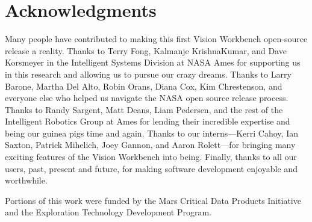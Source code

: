 \chapter*{Acknowledgments}

Many people have contributed to making this first Vision Workbench
open-source release a reality.  Thanks to Terry Fong, Kalmanje
KrishnaKumar, and Dave Korsmeyer in the Intelligent Systems Division
at NASA Ames for supporting us in this research and allowing us to
pursue our crazy dreams.  Thanks to Larry Barone, Martha Del Alto,
Robin Orans, Diana Cox, Kim Chrestenson, and everyone else who helped us navigate the
NASA open source release process.  Thanks to Randy Sargent, Matt
Deans, Liam Pedersen, and the rest of the Intelligent Robotics Group
at Ames for lending their incredible expertise and being our guinea
pigs time and again.  Thanks to our interns---Kerri Cahoy, Ian Saxton,
Patrick Mihelich, Joey Gannon, and Aaron Rolett---for bringing many
exciting features of the Vision Workbench into being.  Finally, thanks
to all our users, past, present and future, for making software
development enjoyable and worthwhile.

\vskip 0.25in
Portions of this work were funded by the Mars Critical Data Products
Initiative and the Exploration Technology Development Program.
